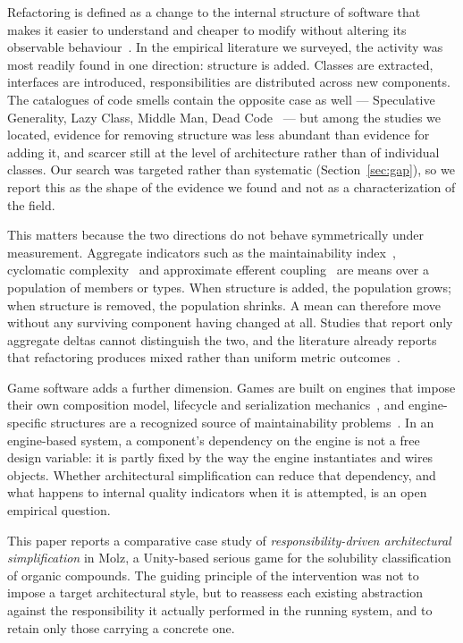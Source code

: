 \documentclass{sbc2019}%
\begin{document}
Refactoring is defined as a change to the internal structure of software that
makes it easier to understand and cheaper to modify without altering its
observable behaviour~\cite{fowler2018,mens2004}. In the empirical literature we
surveyed, the activity was most readily found in one direction: structure is
added. Classes are extracted, interfaces are introduced, responsibilities are
distributed across new components. The catalogues of code smells contain the
opposite case as well --- Speculative Generality, Lazy Class, Middle Man, Dead
Code~\cite{fowler2018} --- but among the studies we located, evidence for
removing structure was less abundant than evidence for adding it, and scarcer
still at the level of architecture rather than of individual classes. Our search
was targeted rather than systematic (Section~\ref{sec:gap}), so we report this as
the shape of the evidence we found and not as a characterization of the field.

This matters because the two directions do not behave symmetrically under
measurement. Aggregate indicators such as the maintainability index~\cite{coleman1994}, cyclomatic complexity~\cite{mccabe1976} and approximate efferent
coupling~\cite{martin2003} are means over a population of members or types.
When structure is added, the population grows; when structure is removed, the
population shrinks. A mean can therefore move without any surviving component
having changed at all. Studies that report only aggregate deltas cannot
distinguish the two, and the literature already reports that refactoring
produces mixed rather than uniform metric outcomes~\cite{szoke2017,bavota2015,palomba2018}.

Game software adds a further dimension. Games are built on engines that impose
their own composition model, lifecycle and serialization mechanics~\cite{aleem2016,politowski2025}, and engine-specific structures are a
recognized source of maintainability problems~\cite{nardone2023,borrelli2020}. In an engine-based system, a component's
dependency on the engine is not a free design variable: it is partly fixed by
the way the engine instantiates and wires objects. Whether architectural
simplification can reduce that dependency, and what happens to internal quality
indicators when it is attempted, is an open empirical question.

This paper reports a comparative case study of \emph{responsibility-driven
architectural simplification} in Molz, a Unity-based serious game for the
solubility classification of organic compounds. The guiding principle of the
intervention was not to impose a target architectural style, but to reassess
each existing abstraction against the responsibility it actually performed in
the running system, and to retain only those carrying a concrete one.
\end{document}
